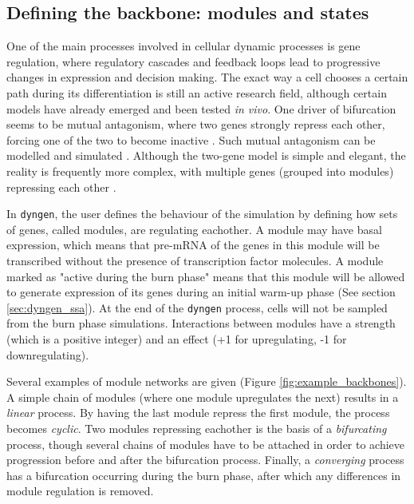 \subsection{Defining the backbone: modules and states} \label{sec:backbone}

One of the main processes involved in cellular dynamic processes is gene regulation, where regulatory cascades and feedback loops lead to progressive changes in expression and decision making. The exact way a cell chooses a certain path during its differentiation is still an active research field, although certain models have already emerged and been tested \textit{in vivo}. One driver of bifurcation seems to be mutual antagonism, where two genes strongly repress each other\cite{rekhtman_directinteractionhematopoietic_1999,xu_regulationbifurcatingcell_2015}, forcing one of the two to become inactive \cite{graf_forcingcellschange_2009}. Such mutual antagonism can be modelled and simulated \cite{wang_quantifyingwaddingtonlandscape_2011, ferrell_bistabilitybifurcationswaddington_2012}. Although the two-gene model is simple and elegant, the reality is frequently more complex, with multiple genes (grouped into modules) repressing each other \cite{yosef_dynamicregulatorynetwork_2013}.

In \texttt{dyngen}, the user defines the behaviour of the simulation by defining how sets of genes, called modules, are regulating eachother.
A module may have basal expression, which means that pre-mRNA of the genes in this module will be transcribed without the presence of transcription factor molecules. A module marked as "active during the burn phase" means that this module will be allowed to generate expression of its genes during an initial warm-up phase (See section \ref{sec:dyngen_ssa}). At the end of the \texttt{dyngen} process, cells will not be sampled from the burn phase simulations. Interactions between modules have a strength (which is a positive integer) and an effect (+1 for upregulating, -1 for downregulating).

Several examples of module networks are given (Figure \ref{fig:example_backbones}). 
A simple chain of modules (where one module upregulates the next) results in a \emph{linear} process. By having the last module repress the first module, the process becomes \emph{cyclic}. Two modules repressing eachother is the basis of a \emph{bifurcating} process, though several chains of modules have to be attached in order to achieve progression before and after the bifurcation process. Finally, a \emph{converging} process has a bifurcation occurring during the burn phase, after which any differences in module regulation is removed.


